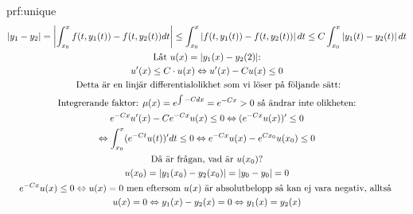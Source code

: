 \begin{prf}{prf:unique}
  \begin{equation*}
    \begin{gathered}
      \left|y_1-y_2\right| = \left|\int_{x_0}^{x}f(t,y_1(t))-f(t,y_2(t))dt\right|\leq\int_{x_0}^{x}\left|f(t,y_1(t))-f(t,y_2(t))\right|dt\leq C\int_{x_0}^{x}\left|y_1(t)-y_2(t)\right|dt\\
      \text{Låt $u(x)= \left|y_1(x)-y_2(2)\right|$:}\\
      u^{\prime}(x)\leq C\cdot u(x)\Leftrightarrow u^{\prime}(x)-Cu(x)\leq0\\
      \text{ Detta är en linjär differentialolikhet som vi löser på följande sätt:}\\
      \text{Integrerande faktor: }\mu(x)=e^{\int -Cdx}= e^{-Cx} > 0 \text{ så ändrar inte olikheten:}\\
      e^{-Cx}u^{\prime}(x)-Ce^{-Cx}u(x)\leq0\Leftrightarrow (e^{-Cx}u(x))^{\prime}\leq0\\
      \Leftrightarrow\int_{x_0}^{x}(e^{-Ct}u(t))^{\prime}dt\leq0 \Leftrightarrow e^{-Cx}u(x)-e^{Cx_0}u(x_0)\leq0\\
      \text{Då är frågan, vad är $u(x_0)$?}\\
      u(x_0)=\left|y_1(x_0)-y_2(x_0)\right| = \left|y_0-y_0\right|=0\\
      e^{-Cx}u(x)\leq0 \Leftrightarrow u(x)=0 \text{ men eftersom $u(x)$ är absolutbelopp så kan ej vara negativ, alltså }\\
      u(x)=0\Leftrightarrow y_1(x)-y_2(x)=0 \Leftrightarrow y_1(x)=y_2(x)
    \end{gathered}
  \end{equation*}
\end{prf}












